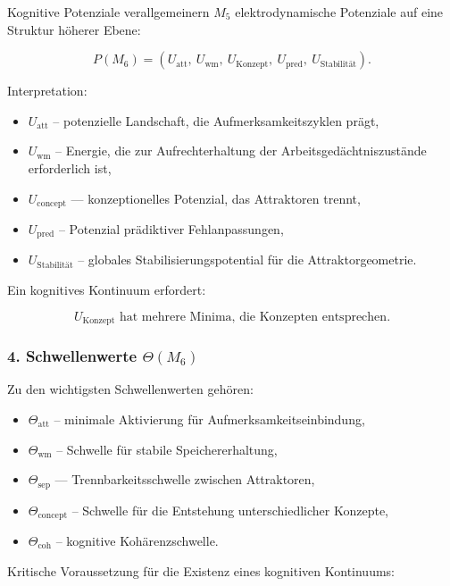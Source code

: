 Kognitive Potenziale verallgemeinern $M_5$ elektrodynamische Potenziale auf eine Struktur höherer Ebene:

\[
P(M_6) =
(U_{\mathrm{att}},\
U_{\mathrm{wm}},\
U_{\mathrm{Konzept}},\
U_{\mathrm{pred}},\
U_{\mathrm{Stabilität}}).
\]

Interpretation:

\begin{itemize}
    \item $U_{\mathrm{att}}$ – potenzielle Landschaft, die Aufmerksamkeitszyklen prägt,
    \item $U_{\mathrm{wm}}$ – Energie, die zur Aufrechterhaltung der Arbeitsgedächtniszustände erforderlich ist,
    \item $U_{\mathrm{concept}}$ — konzeptionelles Potenzial, das Attraktoren trennt,
    \item $U_{\mathrm{pred}}$ – Potenzial prädiktiver Fehlanpassungen,
    \item $U_{\mathrm{Stabilität}}$ – globales Stabilisierungspotential für die Attraktorgeometrie.
\end{itemize}

Ein kognitives Kontinuum erfordert:

\[
U_{\mathrm{Konzept}} \text{ hat mehrere Minima, die Konzepten entsprechen}.
\]

\subsubsection*{4. Schwellenwerte \texorpdfstring{$\Theta(M_6)$}{\Theta(M_6)}}

Zu den wichtigsten Schwellenwerten gehören:

\begin{itemize}
    \item $\Theta_{\mathrm{att}}$ – minimale Aktivierung für Aufmerksamkeitseinbindung,
    \item $\Theta_{\mathrm{wm}}$ – Schwelle für stabile Speichererhaltung,
    \item $\Theta_{\mathrm{sep}}$ — Trennbarkeitsschwelle zwischen Attraktoren,
    \item $\Theta_{\mathrm{concept}}$ – Schwelle für die Entstehung unterschiedlicher Konzepte,
    \item $\Theta_{\mathrm{coh}}$ – kognitive Kohärenzschwelle.
\end{itemize}

Kritische Voraussetzung für die Existenz eines kognitiven Kontinuums:

